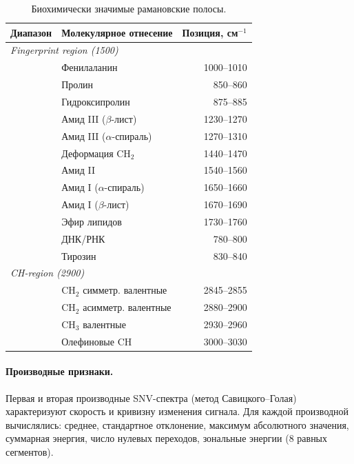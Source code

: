 \documentclass[12pt, a4paper]{article}
\begin{document}
\begin{table}[H]
\centering
\caption{Биохимически значимые рамановские полосы.}
\label{tab:bands}
\begin{tabular}{llr}
\toprule
\textbf{Диапазон} & \textbf{Молекулярное отнесение} & \textbf{Позиция, см$^{-1}$} \\
\midrule
\multicolumn{3}{l}{\textit{Fingerprint region (1500)}} \\
& Фенилаланин                & 1000–1010 \\
& Пролин                     & 850–860   \\
& Гидроксипролин             & 875–885   \\
& Амид III (\(\beta\)-лист)          & 1230–1270 \\
& Амид III (\(\alpha\)-спираль)       & 1270–1310 \\
& Деформация CH$_2$          & 1440–1470 \\
& Амид II                    & 1540–1560 \\
& Амид I (\(\alpha\)-спираль)         & 1650–1660 \\
& Амид I (\(\beta\)-лист)            & 1670–1690 \\
& Эфир липидов               & 1730–1760 \\
& ДНК/РНК                    & 780–800   \\
& Тирозин                    & 830–840   \\
\midrule
\multicolumn{3}{l}{\textit{CH-region (2900)}} \\
& CH$_2$ симметр. валентные  & 2845–2855 \\
& CH$_2$ асимметр. валентные & 2880–2900 \\
& CH$_3$ валентные           & 2930–2960 \\
& Олефиновые CH              & 3000–3030 \\
\bottomrule
\end{tabular}
\end{table}

\paragraph{Производные признаки.}
Первая и вторая производные SNV-спектра (метод Савицкого–Голая)
характеризуют скорость и кривизну изменения сигнала.
Для каждой производной вычислялись: среднее, стандартное отклонение,
максимум абсолютного значения, суммарная энергия,
число нулевых переходов, зональные энергии (8 равных сегментов).
\end{document}
